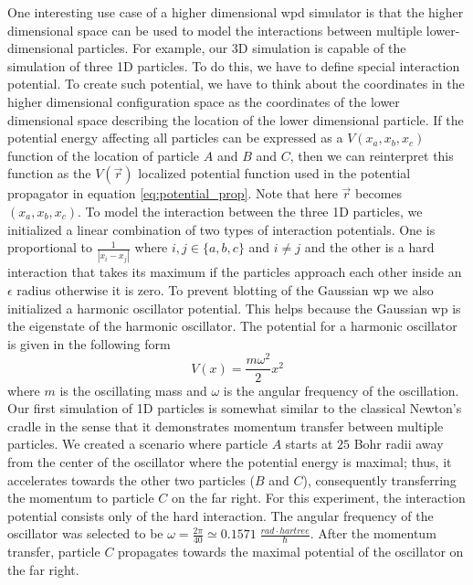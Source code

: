 One interesting use case of a higher dimensional \acrshort{wpd} simulator is that the higher dimensional space can be used to model the interactions between multiple lower-dimensional particles.
For example, our 3D simulation is capable of the simulation of three 1D particles.
To do this, we have to define special interaction potential.
To create such potential, we have to think about the coordinates in the higher dimensional configuration space as the coordinates of the lower dimensional space describing the location of the lower dimensional particle.
If the potential energy affecting all particles can be expressed as a $V(x_a, x_b, x_c)$ function of the location of particle $A$ and $B$ and $C$, then we can reinterpret this function as the $V(\vec{r})$ localized potential function used in the potential propagator in equation \ref{eq:potential_prop}.
Note that here $\vec{r}$ becomes $(x_a, x_b, x_c)$.
To model the interaction between the three 1D particles, we initialized a linear combination of two types of interaction potentials.
One is proportional to $\frac{1}{|x_i - x_j|}$ where $i,j\in\{a,b,c\}$ and $i\neq j$ and the other is a hard interaction that takes its maximum if the particles approach each other inside an $\epsilon$ radius otherwise it is zero.
To prevent blotting of the Gaussian \acrshort{wp} we also initialized a harmonic oscillator potential.
This helps because the Gaussian \acrshort{wp} is the eigenstate of the harmonic oscillator.
The potential for a harmonic oscillator is given in the following form
\begin{equation}
	\label{eq:harmonic_osc}
	V(x) = \frac{m\omega^2}{2}x^2
\end{equation}
where $m$ is the oscillating mass and $\omega$ is the angular frequency of the oscillation.
Our first simulation of 1D particles is somewhat similar to the classical Newton's cradle \cite{Gauld2006}
in the sense that it demonstrates momentum transfer between multiple particles.
We created a scenario where particle $A$ starts at $25$ Bohr radii away from the center of the oscillator where the potential energy is maximal; thus, it accelerates towards the other two particles ($B$ and $C$), consequently transferring the momentum to particle $C$ on the far right.
For this experiment, the interaction potential consists only of the hard interaction.
The angular frequency of the oscillator was selected to be $\omega = \frac{2\pi}{40} \simeq 0.1571\; \frac{rad\cdot hartree}{\hbar}$.
After the momentum transfer, particle $C$ propagates towards the maximal potential of the oscillator on the far right.
